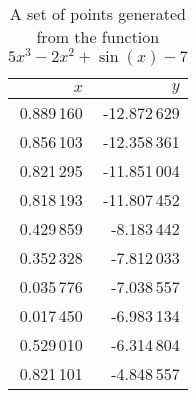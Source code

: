 \begin{table}[ht!]
  \centering
  \begin{tabular}{|r|r|}
    \hline
    $x$ & $y$	\\
    \hline
    \hline
    0.889\,160 & -12.872\,629	\\
    \hline
    0.856\,103 & -12.358\,361	\\
    \hline
    0.821\,295 & -11.851\,004	\\
    \hline
    0.818\,193 & -11.807\,452	\\
    \hline
    0.429\,859 & -8.183\,442	\\
    \hline
    0.352\,328 & -7.812\,033	\\
    \hline
    0.035\,776 & -7.038\,557	\\
    \hline
    0.017\,450 & -6.983\,134	\\
    \hline
    0.529\,010 & -6.314\,804	\\
    \hline
    0.821\,101 & -4.848\,557	\\
    \hline
  \end{tabular}
  \caption{A set of points generated from the function $5x^3 - 2x^2 + \sin(x) - 7$}
  \label{tab:bg:gp:repr_ev:points}
\end{table}